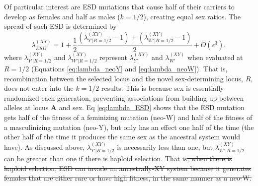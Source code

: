 \documentclass[10pt,letterpaper]{article}
\providecommand{\DIFadd}[1]{{\protect\color{blue}\uwave{#1}}} %
\providecommand{\DIFdel}[1]{{\protect\color{red}\sout{#1}}}                      %
\providecommand{\DIFaddbegin}{} %
\providecommand{\DIFaddend}{} %
\providecommand{\DIFdelbegin}{} %
\providecommand{\DIFdelend}{} %
\begin{document}
Of particular interest are ESD mutations that cause half of their carriers to develop as females and half as males ($k=1/2$), creating equal sex ratios.
The spread of such ESD is determined by
\begin{equation}
\lambda_{ESD'}^{(XY)} =1+ \frac{1}{2}\frac{(\lambda_{Y'\rvert R=1/2}^{(XY)}-1) + (\lambda_{W'\rvert R=1/2}^{(XY)}-1)}{2} + O\left(\epsilon^3\right),
\label{eq:lambda_ESD}
\end{equation}
\noindent
where $\lambda_{Y'\rvert R=1/2}^{(XY)}$ and $\lambda_{W'\rvert R=1/2}^{(XY)}$ represent $\lambda_{Y'}^{(XY)}$ and $\lambda_{W'}^{(XY)}$ when evaluated at $R=1/2$ (Equations \ref{eq:lambda_neoY} and \ref{eq:lambda_neoW}).
That is, recombination between the selected locus and the novel sex-determining locus, $R$, does not enter into the $k=1/2$ results.
This is because sex is essentially randomized each generation, %
preventing associations from building up between alleles at locus $\mathbf{A}$ and sex. 
Eq \eqref{eq:lambda_ESD} shows that the ESD mutation gets half of the fitness of a feminizing mutation (neo-W) and half of the fitness of a masculinizing mutation (neo-Y), but only has an effect one half of the time (the other half of the time it produces the same sex as the ancestral system would have). 
As discussed above, $\lambda_{Y'\rvert R=1/2}^{(XY)}$ is necessarily less than one, but $\lambda_{W'\rvert R=1/2}^{(XY)}$ can be greater than one if there is haploid selection.
That is\DIFdelbegin \DIFdel{, when there is haploid selection, ESD can invade an ancestrally-XY system because it generates females that are either rare or have high fitness, in the same manner as a neo-W.
}\DIFdelend \DIFaddbegin \DIFadd{:
}\vspace{0.5cm}
\DIFaddend 
\end{document}
